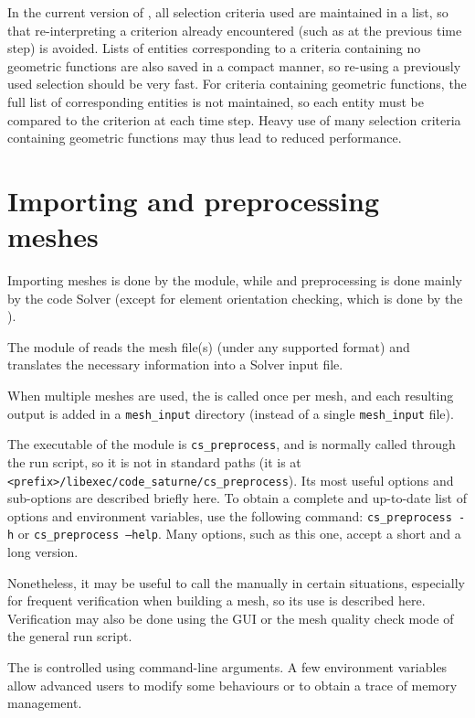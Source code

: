 {{{{In the current version of \CS, all selection criteria used
are maintained in a list, so that re-interpreting a criterion already
encountered (such as at the previous time step) is avoided.
Lists of entities corresponding to a criteria containing no geometric
functions are also saved in a compact manner, so re-using a previously
used selection should be very fast. For criteria containing geometric
functions, the full list of corresponding entities is not maintained,
so each entity must be compared to the criterion at each time step.
Heavy use of many selection criteria containing geometric functions
may thus lead to reduced performance.

\section{Importing and preprocessing meshes}

Importing meshes is done by the \pcs module, while and preprocessing
is done mainly by the code Solver (except for element orientation
checking, which is done by the \pcs).

The \pcs module of \CS reads the
mesh file(s) (under any supported format) and translates the necessary
information into a Solver input file.

When multiple meshes are used, the \pcs is called once per mesh,
and each resulting output is added in a \texttt{mesh\_input}
directory (instead of a single \texttt{mesh\_input} file).

The executable of the \pcs module is \texttt{cs\_preprocess}, and
is normally called through the run script, so it is not in standard paths
(it is at \texttt{<prefix>/libexec/code\_saturne/cs\_preprocess}).
Its most useful options and sub-options are described briefly here.
To obtain a complete and up-to-date list of options and environment
variables, use the following command:
\texttt{cs\_preprocess~-h} or \texttt{cs\_preprocess~--help}.
Many options, such as this one, accept a short and a long version.

Nonetheless, it may be useful to call the \pcs manually
in certain situations, especially for frequent verification when
building a mesh, so its use is described here. Verification
may also be done using the GUI or the mesh quality check mode
of the general run script.

The \pcs is controlled using command-line arguments.
A few environment variables allow advanced users to modify
some behaviours or to obtain a trace of memory management.

}}}}
